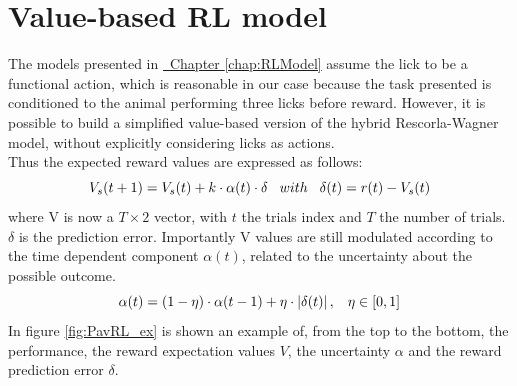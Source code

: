 \chapter{Value-based RL model}
\label{chap:SimpRL}
The models presented in \hyperref[chap:RLModel]{~Chapter \ref*{chap:RLModel}} assume the lick to be a functional action, which is reasonable in our case because the task presented is conditioned to the animal performing three licks before reward. However, it is possible to build a simplified value-based version of the hybrid Rescorla-Wagner model, without explicitly considering licks as actions.\\Thus the expected reward values are expressed as follows:
\begin{equation}
V_s(t+1)=V_s(t)+k\cdot\alpha(t)\cdot\delta  \hspace{0.3cm} with \hspace{0.3cm}\delta(t)=r(t)-V_s(t)
\label{VValues}
\end{equation}
where V is now a $
T\times 2$ vector, with $t$ the trials index and $T$ the number of trials. $\delta$ is the prediction error. Importantly V values are still modulated according to the time dependent component $\alpha(t)$, related to the uncertainty about the possible outcome.
\begin{equation}
    \alpha(t)=(1-\eta)\cdot\alpha(t-1)+\eta\cdot\left\lvert\delta(t)\right\rvert,\hspace{0.3cm} \eta\in[0,1]
\end{equation}
In figure \ref{fig:PavRL_ex} is shown an example of, from the top to the bottom, the performance, the reward expectation values $V$, the uncertainty $\alpha$ and the reward prediction error $\delta$.
